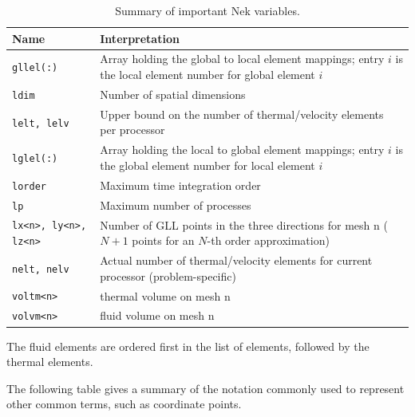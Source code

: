 \documentclass[10pt]{article}
\numberwithin{equation}{section} %
\begin{document}
\begin{itemize}
\begin{table}[H]
\caption{Summary of important Nek variables.}
\centering
\begin{tabular}{p{2cm}p{13cm}}
\hline\hline
Name & Interpretation \\ [0.5ex]
\hline
{\tt gllel(:)} & Array holding the global to local element mappings; entry \(i\) is the local element number for global element \(i\)\\
{\tt ldim} & Number of spatial dimensions\\
{\tt lelt, lelv} & Upper bound on the number of thermal/velocity elements per processor\\
{\tt lglel(:)} & Array holding the local to global element mappings; entry \(i\) is the global element number for local element \(i\)\\
{\tt lorder} & Maximum time integration order\\
{\tt lp} & Maximum number of processes\\
{\tt lx<n>, ly<n>, lz<n>} & Number of GLL points in the three directions for mesh n (\(N+1\) points for an \(N\)-th order approximation)\\
{\tt nelt, nelv} & Actual number of thermal/velocity elements for current processor (problem-specific)\\
{\tt voltm<n>} & thermal volume on mesh n\\
{\tt volvm<n>} & fluid volume on mesh n\\
\hline
\end{tabular}
\end{table}

The fluid elements are ordered first in the list of elements, followed by the thermal elements.

The following table gives a summary of the notation commonly used to represent other common terms, such as coordinate points.


\end{itemize}
\end{document}
